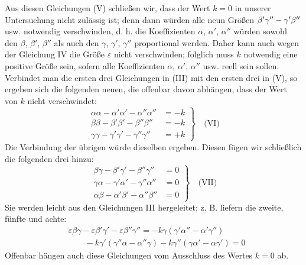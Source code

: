 Aus diesen Gleichungen (V) schließen wir, dass der Wert $k=0$ in unserer Untersuchung nicht zulässig ist; denn dann würden alle neun Größen $\beta'\gamma''-\nobreak{}\gamma'\beta''$ usw. notwendig verschwinden, d. h. die Koeffizienten $\alpha$, $\alpha'$, $\alpha''$ würden sowohl den $\beta$, $\beta'$, $\beta''$ als auch den $\gamma$, $\gamma'$, $\gamma''$ proportional werden. Daher kann auch wegen der Gleichung IV die Größe $\varepsilon$ nicht verschwinden; folglich muss $k$ notwendig eine positive Größe sein, sofern alle Koeffizienten $\alpha$, $\alpha'$, $\alpha''$ usw. reell sein sollen. Verbindet man die ersten drei Gleichungen in (III) mit den ersten drei in (V), so ergeben sich die folgenden neuen, die offenbar davon abhängen, dass der Wert von $k$ nicht verschwindet:
\[
\left.\begin{aligned}
\alpha\alpha-\alpha'\alpha'-\alpha''\alpha''&=-k\\[5pt]
\beta\beta-\beta'\beta'-\beta''\beta''&=-k\\[5pt]
\gamma\gamma-\gamma'\gamma'-\gamma''\gamma''&=+k
\end{aligned}\right\}\quad\text{(VI)}
\]
Die Verbindung der übrigen würde dieselben ergeben. Diesen fügen wir schließlich die folgenden drei hinzu:
\[
\left.\begin{aligned}
\beta\gamma-\beta'\gamma'-\beta''\gamma''&=0\\[5pt]
\gamma\alpha-\gamma'\alpha'-\gamma''\alpha''&=0\\[5pt]
\alpha\beta-\alpha'\beta'-\alpha''\beta''&=0
\end{aligned}\right\}\quad\text{(VII)}
\]
Sie werden leicht aus den Gleichungen III hergeleitet; z. B. liefern die zweite, fünfte und achte:
\[
\begin{aligned}
&\varepsilon\beta\gamma-\varepsilon\beta'\gamma'-\varepsilon\beta''\gamma''=-k\gamma(\gamma'\alpha''-\alpha'\gamma'')\\[6pt]
&\qquad{}-k\gamma'(\gamma''\alpha-\alpha''\gamma)-k\gamma''(\gamma\alpha'-\alpha\gamma')=0
\end{aligned}
\]
Offenbar hängen auch diese Gleichungen vom Ausschluss des Wertes $k=0$ ab.

